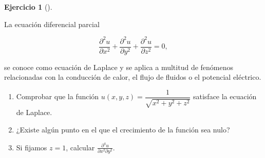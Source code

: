 \documentclass[
  spanish,
  a4paper,
]{scrreport}
\theoremstyle{definition}
\newtheorem{exercise}{Ejercicio}[chapter]
\theoremstyle{remark}
\begin{document}
\begin{exercise}[]\protect\hypertarget{exr-ecuacion-laplace}{}\label{exr-ecuacion-laplace}

La ecuación diferencial parcial

\[
\frac{\partial^2 u}{\partial x^2} + \frac{\partial^2 u}{\partial y^2} + \frac{\partial^2 u}{\partial z^2} = 0,
\]

se conoce como ecuación de Laplace y se aplica a multitud de fenómenos
relacionadas con la conducción de calor, el flujo de fluidos o el
potencial eléctrico.

\begin{enumerate}
\def\labelenumi{\alph{enumi}.}
\item
  Comprobar que la función
  \(u(x,y,z)=\dfrac{1}{\sqrt{x^2 + y^2 + z^2}}\) satisface la ecuación
  de Laplace.
\item
  ¿Existe algún punto en el que el crecimiento de la función sea nulo?
\item
  Si fijamos \(z=1\), calcular
  \(\frac{\partial^4u}{\partial x^2\partial y^2}\).
\end{enumerate}

\end{exercise}
\end{document}
